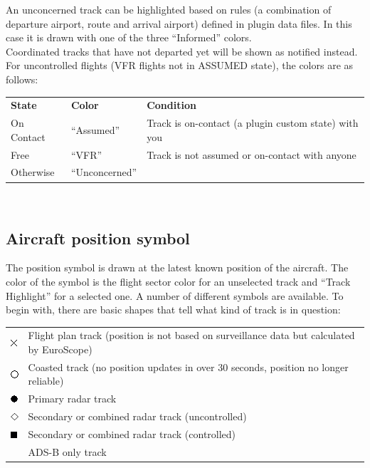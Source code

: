 \documentclass[11pt,a4paper,oldfontcommands]{memoir}
\begin{document}
An unconcerned track can be highlighted based on rules (a combination of departure airport, route and
arrival airport) defined in plugin data files. In this case it is drawn with one of the three “Informed” colors.\\

Coordinated tracks that have not departed yet will be shown as notified instead.\\

For uncontrolled flights (VFR flights not in ASSUMED state), the colors are as follows:\\
\begin{tabular}{p{5cm}p{5cm}p{5cm}}
\textbf{State}  & \textbf{Color}    & \textbf{Condition}
\\On Contact    & “Assumed”         & Track is on-contact (a plugin custom state) with you
\\Free          & “VFR”             & Track is not assumed or on-contact with anyone
\\Otherwise     & “Unconcerned”     &
\end{tabular}\\

\subsection{Aircraft position symbol}
The position symbol is drawn at the latest known position of the aircraft. The color of the symbol is the
flight sector color for an unselected track and “Track Highlight” for a selected one. A number of different
symbols are available. To begin with, there are basic shapes that tell what kind of track is in question:\\

\begin{tabular}{p{5cm}p{5cm}}
\includegraphics{img/rps_fpasd.png} & Flight plan track (position is not based on surveillance data but calculated by EuroScope)
\\\includegraphics{img/rps_coast.png} & Coasted track (no position updates in over 30 seconds, position no longer reliable)
\\\includegraphics{img/rps_psr.png} & Primary radar track
\\\includegraphics{img/rps_sec.png} & Secondary or combined radar track (uncontrolled)
\\\includegraphics{img/rps_psr+ssr.png} & Secondary or combined radar track (controlled)
\\ & ADS-B only track
\end{tabular}\\
\end{document}
